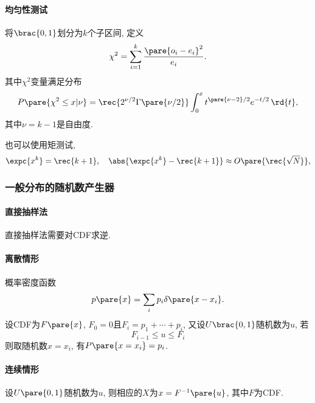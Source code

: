 \documentclass[hidelinks]{ctexart}
\begin{document}

\paragraph{均匀性测试} %
\label{par:均匀性测试}

将$\brac{0,1}$划分为$k$个子区间, 定义
\[ \chi^2 = \sum_{i=1}^k \frac{\pare{o_i - e_i}^2}{e_i}. \]
其中$\chi^2$变量满足分布
\[ P\pare{\chi^2\le x\vert \nu} = \rec{2^{\nu/2}\Gamma\pare{\nu/2}}\int_0^x t^{\pare{\nu-2}/2}e^{-t/2}\,\rd{t}, \]
其中$\nu = k-1$是自由度.


\par
也可以使用矩测试,
\[ \expc{x^k} = \rec{k+1},\quad \abs{\expc{x^k} - \rec{k+1}} \approx O\pare{\rec{\sqrt{N}}}, \]


\subsubsection{一般分布的随机数产生器} %
\label{ssub:一般分布的随机数产生器}

\paragraph{直接抽样法} %
\label{par:直接抽样法}

直接抽样法需要对CDF求逆.


\paragraph{离散情形} %
\label{par:离散情形}

概率密度函数
\[ p\pare{x} = \sum_i p_i\delta\pare{x-x_i}. \]
设CDF为$F\pare{x}$, $F_0 = 0$且$F_i = p_1 + \cdots + p_i$, 又设$U\brac{0,1}$随机数为$u$, 若
\[ F_{i-1} \le u \le F_{i} \]
则取随机数$x = x_i$, 有$P\pare{x=x_i} = p_i$.


\paragraph{连续情形} %
\label{par:连续情形}

设$U\pare{0,1}$随机数为$u$, 则相应的$X$为$x = F^{-1}\pare{u}$, 其中$F$为CDF.
\end{document}
